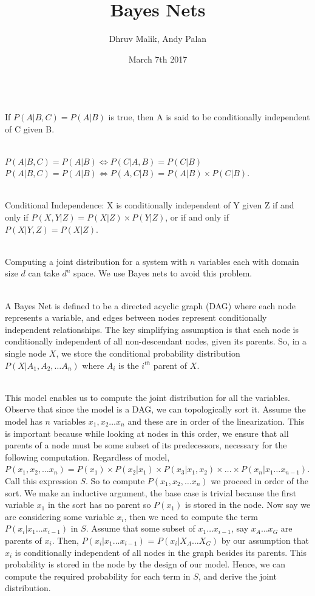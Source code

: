 \documentclass[11pt]{article}
\begin{document}
\title{Bayes Nets}
\date{March 7th 2017}
\author{Dhruv Malik, Andy Palan}

\maketitle
\noindent ~\\If $P(A|B,C) = P(A|B)$ is true, then A is said to be conditionally independent of C given B.

\noindent ~\\$P(A|B,C) = P(A|B) \Longleftrightarrow P(C|A,B) = P(C|B)$
\noindent ~\\$P(A|B,C) = P(A|B) \Longleftrightarrow P(A,C|B) = P(A|B) \times P(C|B)$.

\noindent ~\\Conditional Independence: X is conditionally independent of Y given Z if and only if $P(X,Y|Z) = P(X|Z) \times P(Y|Z)$, or if and only if $P(X|Y,Z) = P(X|Z)$.

\noindent ~\\Computing a joint distribution for a system with $n$ variables each with domain size $d$ can take $d^n$ space. We use Bayes nets to avoid this problem.

\noindent ~\\A Bayes Net is defined to be a directed acyclic graph (DAG) where each node represents a variable, and edges between nodes represent conditionally independent relationships. The key simplifying assumption is that each node is conditionally independent of all non-descendant nodes, given its parents. So, in a single node $X$, we store the conditional probability distribution $P(X|A_1, A_2, \dots A_n)$ where $A_i$ is the $i^{th}$ parent of $X$.

\noindent ~\\This model enables us to compute the joint distribution for all the variables. Observe that since the model is a DAG, we can topologically sort it. Assume the model has $n$ variables $x_1, x_2 \dots x_n$ and these are in order of the linearization. This is important because while looking at nodes in this order, we ensure that all parents of a node must be some subset of its predecessors, necessary for the following computation. Regardless of model, $P(x_1, x_2, \dots x_n) = P(x_1) \times P(x_2|x_1) \times P(x_3|x_1, x_2) \times \dots \times P(x_n|x_1 \dots x_{n-1})$. Call this expression $S$. So to compute $P(x_1, x_2, \dots x_n)$ we proceed in order of the sort. We make an inductive argument, the base case is trivial because the first variable $x_1$ in the sort has no parent so $P(x_1)$ is stored in the node. Now say we are considering some variable $x_i$, then we need to compute the term $P(x_i|x_1 \dots x_{i-1})$ in $S$. Assume that some subset of $x_1 \dots x_{i-1}$, say $x_A \dots x_G$ are parents of $x_i$. Then, $P(x_i|x_1 \dots x_{i-1})$ = $P(x_i|X_A \dots X_G)$ by our assumption that $x_i$ is conditionally independent of all nodes in the graph besides its parents. This probability is stored in the node by the design of our model. Hence, we can compute the required probability for each term in $S$, and derive the joint distribution.


\end{document}
